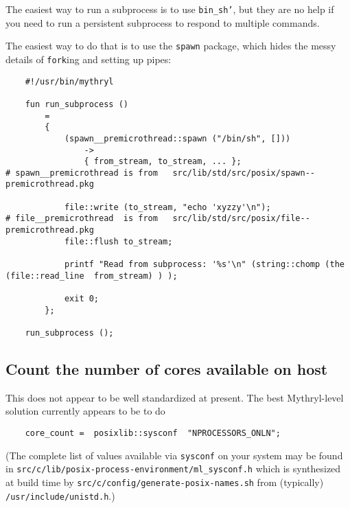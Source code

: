 The easiest way to run a subprocess is to use 
{\tt bin\_sh'}, but they are no help if you need to 
run a persistent subprocess to respond to multiple commands.

The easiest way to do that is to use the {\tt spawn} package, 
which hides the messy details of {\tt fork}ing and setting 
up pipes:
\begin{verbatim}
    #!/usr/bin/mythryl

    fun run_subprocess ()
        = 
        {
            (spawn__premicrothread::spawn ("/bin/sh", []))
                ->
                { from_stream, to_stream, ... };                                        # spawn__premicrothread is from   src/lib/std/src/posix/spawn--premicrothread.pkg

            file::write (to_stream, "echo 'xyzzy'\n");                                  # file__premicrothread  is from   src/lib/std/src/posix/file--premicrothread.pkg
            file::flush to_stream;

            printf "Read from subprocess: '%s'\n" (string::chomp (the (file::read_line  from_stream) ) );

            exit 0;
        };

    run_subprocess ();

\end{verbatim}
\cutend*


\subsection{Count the number of cores available on host}

This does not appear to be well standardized at present. 
The best Mythryl-level solution currently appears to be to do 

\begin{verbatim}
    core_count =  posixlib::sysconf  "NPROCESSORS_ONLN";
\end{verbatim}

(The complete list of values available via {\tt sysconf} on your system may be 
found in {\tt src/c/lib/posix-process-environment/ml\_sysconf.h} 
which is synthesized at build time by {\tt src/c/config/generate-posix-names.sh} 
from (typically) {\tt /usr/include/unistd.h}.)

\cutend*


